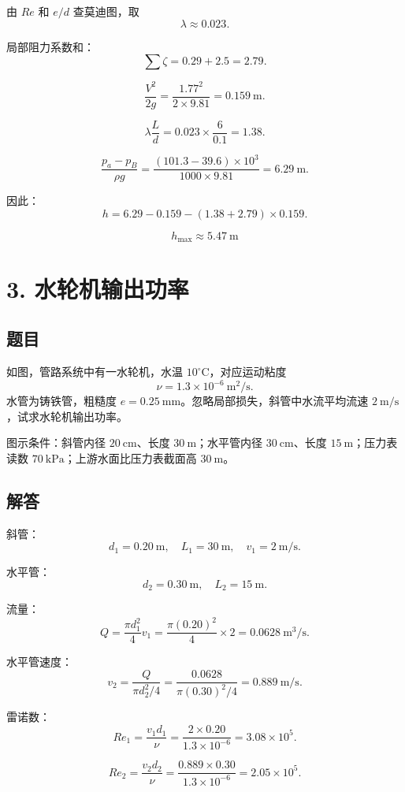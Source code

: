 ﻿\documentclass[11pt,a4paper]{ctexart}
\begin{document}
由 \(Re\) 和 \(e/d\) 查莫迪图，取
\[
\lambda\approx0.023.
\]

局部阻力系数和：
\[
\sum\zeta=0.29+2.5=2.79.
\]

\[
\frac{V^2}{2g}=\frac{1.77^2}{2\times9.81}=0.159\ \mathrm{m}.
\]

\[
\lambda\frac{L}{d}=0.023\times\frac{6}{0.1}=1.38.
\]

\[
\frac{p_a-p_B}{\rho g}
=\frac{(101.3-39.6)\times10^3}{1000\times9.81}
=6.29\ \mathrm{m}.
\]

因此：
\[
h=6.29-0.159-(1.38+2.79)\times0.159.
\]

\[
\boxed{h_{\max}\approx5.47\ \mathrm{m}}
\]

\section*{3. 水轮机输出功率}

\subsection*{题目}

如图，管路系统中有一水轮机，水温 \(10^\circ\mathrm{C}\)，对应运动粘度
\[
\nu=1.3\times10^{-6}\ \mathrm{m^2/s}.
\]
水管为铸铁管，粗糙度 \(e=0.25\ \mathrm{mm}\)。忽略局部损失，斜管中水流平均流速 \(2\ \mathrm{m/s}\)，试求水轮机输出功率。

图示条件：斜管内径 \(20\ \mathrm{cm}\)、长度 \(30\ \mathrm{m}\)；水平管内径 \(30\ \mathrm{cm}\)、长度 \(15\ \mathrm{m}\)；压力表读数 \(70\ \mathrm{kPa}\)；上游水面比压力表截面高 \(30\ \mathrm{m}\)。

\subsection*{解答}

斜管：
\[
d_1=0.20\ \mathrm{m},\quad L_1=30\ \mathrm{m},\quad v_1=2\ \mathrm{m/s}.
\]

水平管：
\[
d_2=0.30\ \mathrm{m},\quad L_2=15\ \mathrm{m}.
\]

流量：
\[
Q=\frac{\pi d_1^2}{4}v_1
=\frac{\pi(0.20)^2}{4}\times2
=0.0628\ \mathrm{m^3/s}.
\]

水平管速度：
\[
v_2=\frac{Q}{\pi d_2^2/4}
=\frac{0.0628}{\pi(0.30)^2/4}
=0.889\ \mathrm{m/s}.
\]

雷诺数：
\[
Re_1=\frac{v_1d_1}{\nu}
=\frac{2\times0.20}{1.3\times10^{-6}}
=3.08\times10^5.
\]

\[
Re_2=\frac{v_2d_2}{\nu}
=\frac{0.889\times0.30}{1.3\times10^{-6}}
=2.05\times10^5.
\]
\end{document}

